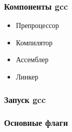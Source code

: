 
\begin{frame}
\frametitle{Компоненты gcc}
\begin{itemize}
  \item Препроцессор
  \item Компилятор
  \item Ассемблер
  \item Линкер
\end{itemize}
\end{frame}

\begin{frame}
\frametitle{Запуск gcc}
\end{frame}

\begin{frame}
\frametitle{Основные флаги}
\end{frame}

